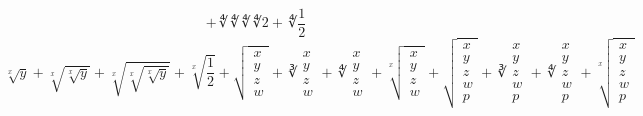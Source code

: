 \documentclass { article }
\begin{document}
\begin{itemize}
\[          + \fourthroot{\fourthroot{\fourthroot{\fourthroot{2}}}} + \fourthroot{\frac{1}{2}}
        \]
        \[
            \sqrt[x]{y} + \sqrt[x]{\sqrt[x]{y}} + \sqrt[x]{\sqrt[x]{\sqrt[x]{y}}}
          + \sqrt[x]{\frac{1}{2}}
          + \sqrt      { \begin{matrix} x \\ y \\ z \\ w \end{matrix} }
          + \cuberoot  { \begin{matrix} x \\ y \\ z \\ w \end{matrix} }
          + \fourthroot{ \begin{matrix} x \\ y \\ z \\ w \end{matrix} }
          + \sqrt[x]   { \begin{matrix} x \\ y \\ z \\ w \end{matrix} }
          + \sqrt      { \begin{matrix} x \\ y \\ z \\ w \\ p \end{matrix} }
          + \cuberoot  { \begin{matrix} x \\ y \\ z \\ w \\ p \end{matrix} }
          + \fourthroot{ \begin{matrix} x \\ y \\ z \\ w \\ p \end{matrix} }
          + \sqrt[x]   { \begin{matrix} x \\ y \\ z \\ w \\ p \end{matrix} }
        \]

\end{itemize}
\end{document}
